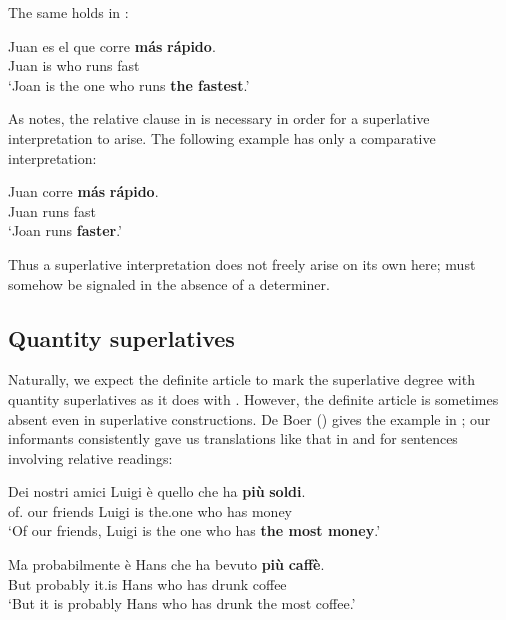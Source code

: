 \documentclass[output=paper
,modfonts
,nonflat]{langsci/langscibook}
\begin{document}
\newpage
The same holds in :

\ea \label{ex:coppockstrand:62}
\gll Juan es el que corre \textbf{m\'as} \textbf{r\'apido}.\\
Juan is  who runs \cmpr{} fast\\ 
\glt`Joan is the one who runs \textbf{the fastest}.' \citep[1--2]{Rohena-Madrazo2007}
\z

As \citet{Rohena-Madrazo2007} notes, the relative clause in  is necessary in order for a superlative interpretation to arise. The following example has only a comparative interpretation:

\ea \label{ex:coppockstrand:63}
\gll Juan corre \textbf{m\'as} \textbf{r\'apido}.\\
Juan  runs \cmpr{} fast\\ 
\glt `Joan runs \textbf{faster}.'
\z

Thus a superlative interpretation does not freely arise on its own here;  must somehow be signaled in the absence of a determiner.

\subsection{Quantity superlatives}

Naturally, we expect the definite article to mark the superlative degree with quantity superlatives as it does with . However, the definite article is sometimes absent even in superlative constructions. De Boer (\citeyear[53]{deBoer1986}) gives the example in ; our informants consistently gave us translations like that in  and  for sentences involving relative readings:

\ea \label{ex:coppockstrand:64}
\gll Dei nostri amici Luigi \`e quello che ha \textbf{pi\`u} \textbf{soldi}.\\
of. our friends Luigi is the.one who has \cmpr{} money\\ 
\glt `Of our friends, Luigi is the one who has \textbf{the most money}.'
\z
  
\ea \label{ex:coppockstrand:65}
\gll Ma probabilmente è Hans che ha bevuto \textbf{più} \textbf{caffè}.\\
But probably it.is Hans who has drunk \cmpr{} coffee\\ 
\glt `But it is probably Hans who has drunk the most coffee.'
\z
\end{document}
